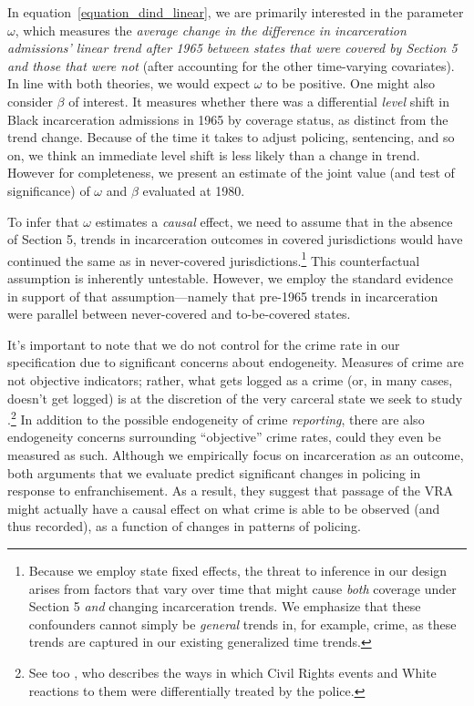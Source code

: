 \documentclass[12pt]{article}
\begin{document}
In equation~\ref{equation_dind_linear}, we are primarily interested in the parameter $\omega$, which measures the \emph{average change in the difference in incarceration admissions' linear trend after 1965 between states that were covered by Section 5 and those that were not} (after accounting for the other time-varying covariates).  In line with both theories, we would expect $\omega$ to be positive.  One might also consider $\beta$ of interest.  It measures whether there was a differential \emph{level} shift in Black incarceration admissions in 1965 by coverage status, as distinct from the trend change.  Because of the time it takes to adjust policing, sentencing, and so on, we think an immediate level shift is less likely than a change in trend. However for completeness, we present an estimate of the joint value (and test of significance) of $\omega$ and $\beta$ evaluated at 1980.

To infer that $\omega$ estimates a \emph{causal} effect, we need to assume that in the absence of Section 5, trends in incarceration outcomes in covered jurisdictions would have continued the same as in never-covered jurisdictions.\footnote{Because we employ state fixed effects, the threat to inference in our design arises from factors that vary over time that might cause \emph{both} coverage under Section 5 \emph{and} changing incarceration trends.  We emphasize that these confounders cannot simply be \emph{general} trends in, for example, crime, as these trends are captured in our existing generalized time trends.}  This counterfactual assumption is inherently untestable.  However, we employ the standard evidence in support of that assumption---namely that pre-1965 trends in incarceration were parallel between never-covered and to-be-covered states.

It's important to note that we do not control for the crime rate in our specification due to significant concerns about endogeneity. Measures of crime are not objective indicators; rather, what gets logged as a crime (or, in many cases, doesn't get logged) is at the discretion of the very carceral state we seek to study \citep{Black:1970wu,Muhammad:2011wf}.\footnote{See too \cite{Ward:2015tc}, who describes the ways in which Civil Rights events and White reactions to them were differentially treated by the police.}  In addition to the possible endogeneity of crime \emph{reporting}, there are also endogeneity concerns surrounding ``objective'' crime rates, could they even be measured as such. Although we empirically focus on incarceration as an outcome, both arguments that we evaluate predict significant changes in policing in response to enfranchisement. As a result, they suggest that passage of the VRA might actually have a causal effect on what crime is able to be observed (and thus recorded), as a function of changes in patterns of policing.
\end{document}
